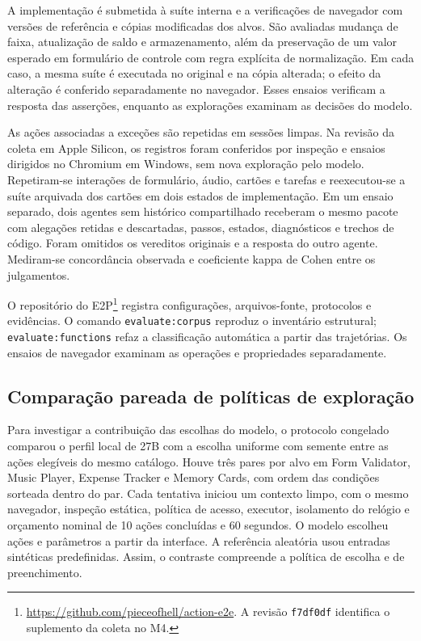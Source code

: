\documentclass[12pt]{article}
\begin{document}
A implementação é submetida à suíte interna e a verificações de navegador com versões de referência e cópias modificadas dos alvos. São avaliadas mudança de faixa, atualização de saldo e armazenamento, além da preservação de um valor esperado em formulário de controle com regra explícita de normalização. Em cada caso, a mesma suíte é executada no original e na cópia alterada; o efeito da alteração é conferido separadamente no navegador. Esses ensaios verificam a resposta das asserções, enquanto as explorações examinam as decisões do modelo.

As ações associadas a exceções são repetidas em sessões limpas. Na revisão da coleta em Apple Silicon, os registros foram conferidos por inspeção e ensaios dirigidos no Chromium em Windows, sem nova exploração pelo modelo. Repetiram-se interações de formulário, áudio, cartões e tarefas e reexecutou-se a suíte arquivada dos cartões em dois estados de implementação. Em um ensaio separado, dois agentes sem histórico compartilhado receberam o mesmo pacote com alegações retidas e descartadas, passos, estados, diagnósticos e trechos de código. Foram omitidos os vereditos originais e a resposta do outro agente. Mediram-se concordância observada e coeficiente kappa de Cohen entre os julgamentos.

O repositório do E2P\footnote{\url{https://github.com/pieceofhell/action-e2e}. A revisão \texttt{f7df0df} identifica o suplemento da coleta no M4.} registra configurações, arquivos-fonte, protocolos e evidências. O comando \texttt{evaluate:corpus} reproduz o inventário estrutural; \texttt{evaluate:functions} refaz a classificação automática a partir das trajetórias. Os ensaios de navegador examinam as operações e propriedades separadamente.


\subsection{Comparação pareada de políticas de exploração}
Para investigar a contribuição das escolhas do modelo, o protocolo congelado comparou o perfil local de 27B com a escolha uniforme com semente entre as ações elegíveis do mesmo catálogo. Houve três pares por alvo em Form Validator, Music Player, Expense Tracker e Memory Cards, com ordem das condições sorteada dentro do par. Cada tentativa iniciou um contexto limpo, com o mesmo navegador, inspeção estática, política de acesso, executor, isolamento do relógio e orçamento nominal de 10 ações concluídas e 60 segundos. O modelo escolheu ações e parâmetros a partir da interface. A referência aleatória usou entradas sintéticas predefinidas. Assim, o contraste compreende a política de escolha e de preenchimento.
\end{document}
